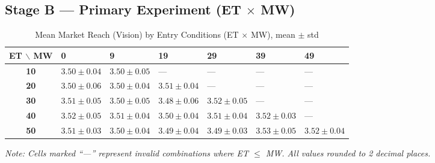 \documentclass{article}
\begin{document}
\subsection{Stage B --- Primary Experiment (ET $\times$ MW)}







\begin{table}[H]
\begin{threeparttable}
\centering
\caption{Mean Market Reach (Vision) by Entry Conditions (ET $\times$ MW), mean $\pm$ std}
\label{tab:vision}
\begin{tabularx}{\textwidth}{cYYYYYY}
\toprule
\textbf{ET $\backslash$ MW} & \textbf{0} & \textbf{9} & \textbf{19} & \textbf{29} & \textbf{39} & \textbf{49} \\
\midrule
\textbf{10} & $3.50\pm0.04$ & $3.50\pm0.05$ & --- & --- & --- & --- \\
\textbf{20} & $3.50\pm0.06$ & $3.50\pm0.04$ & $3.51\pm0.04$ & --- & --- & --- \\
\textbf{30} & $3.51\pm0.05$ & $3.50\pm0.05$ & $3.48\pm0.06$ & $3.52\pm0.05$ & --- & --- \\
\textbf{40} & $3.52\pm0.05$ & $3.51\pm0.04$ & $3.50\pm0.04$ & $3.51\pm0.04$ & $3.52\pm0.03$ & --- \\
\textbf{50} & $3.51\pm0.03$ & $3.50\pm0.04$ & $3.49\pm0.04$ & $3.49\pm0.03$ & $3.53\pm0.05$ & $3.52\pm0.04$ \\
\bottomrule
\end{tabularx}
\begin{tablenotes}
\small
\item \textit{Note: Cells marked ``---'' represent invalid combinations where ET $\leq$ MW. All values rounded to 2 decimal places.}
\end{tablenotes}
\end{threeparttable}
\end{table}
\end{document}
